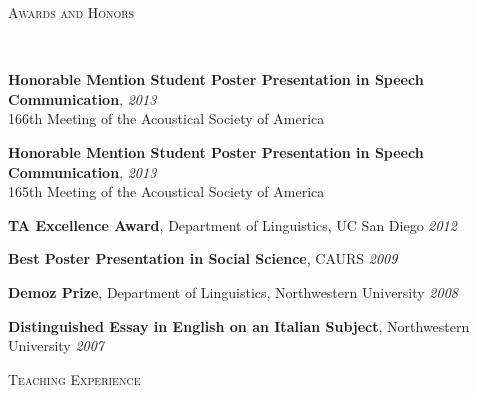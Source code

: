 \documentclass[9pt]{article}
\newenvironment{changemargin}[2]{%
  \begin{list}{}{%
    \setlength{\topsep}{0pt}%
    \setlength{\leftmargin}{#1}%
    \setlength{\rightmargin}{#2}%
    \setlength{\listparindent}{\parindent}%
    \setlength{\itemindent}{\parindent}%
    \setlength{\parsep}{\parskip}%
  }%
  \item[]}{\end{list}
}
\newcommand{\lineover}{
	\begin{changemargin}{-0.05in}{-0.05in}
		\vspace*{-8pt}
		\hrulefill \\
		\vspace*{-2pt}
	\end{changemargin}
}
\newcommand{\header}[1]{
	\begin{changemargin}{-0.5in}{-0.5in}
		\scshape{#1}\\
  	\lineover
	\end{changemargin}
}
\newenvironment{body} {
	\vspace*{-16pt}
	\begin{changemargin}{-0.25in}{-0.5in}
  }	
	{\end{changemargin}
}
\begin{document}
\smallskip

\header{Awards and Honors}

\begin{body}
	\vspace{14pt}

	\textbf{Honorable Mention Student Poster Presentation in Speech Communication}, \hfill{} \emph{2013}\\
	166th Meeting of the Acoustical Society of America
	\medskip	

	\textbf{Honorable Mention Student Poster Presentation in Speech Communication}, \hfill{} \emph{2013}\\
	165th Meeting of the Acoustical Society of America
	\medskip	

	\textbf{TA Excellence Award}, Department of Linguistics, UC San Diego \hfill{} \emph{2012}\\
	\medskip

	\textbf{Best Poster Presentation in Social Science}, CAURS \hfill{} \emph{2009}\\
	\medskip
	
	\textbf{Demoz Prize}, Department of Linguistics, Northwestern University \hfill{} \emph{2008}\\
	\medskip
	
	\textbf{Distinguished Essay in English on an Italian Subject}, Northwestern University \hfill{} \emph{2007}\\
	
\end{body}

\smallskip


\header{Teaching Experience}
\end{document}
